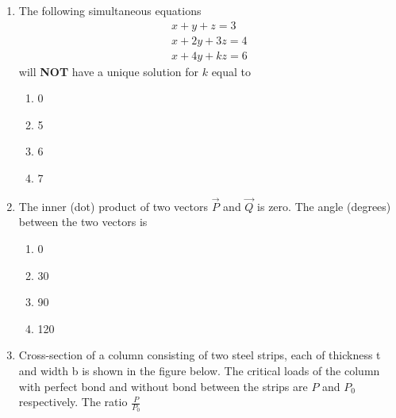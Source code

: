 \documentclass[journal]{IEEEtran}
\begin{document}
\begin{enumerate}
\item The following simultaneous equations
\begin{align*}
    x + y + z = 3\\
    x + 2y + 3z = 4\\
    x + 4y + kz = 6
\end{align*}
will \textbf{NOT} have a unique solution for $k$ equal to
\begin{multicols}{2}
    \begin{enumerate}
        \item 0
        \item 5
        \item 6
        \item 7
    \end{enumerate}
\end{multicols}

\item The inner (dot) product of two vectors $\vec{P}$ and $\vec{Q}$ is zero. The angle (degrees) between the two vectors is
\begin{multicols}{2}
    \begin{enumerate}
        \item 0
        \item 30
        \item 90
        \item 120
    \end{enumerate}
\end{multicols}

\item Cross-section of a column consisting of two steel strips, each of thickness t and width b is shown in the figure below. The critical loads of the column with perfect bond and without bond between the strips are $P$ and $P_0$ respectively. The ratio $\frac{P}{P_0}$
\end{enumerate}
\end{document}

